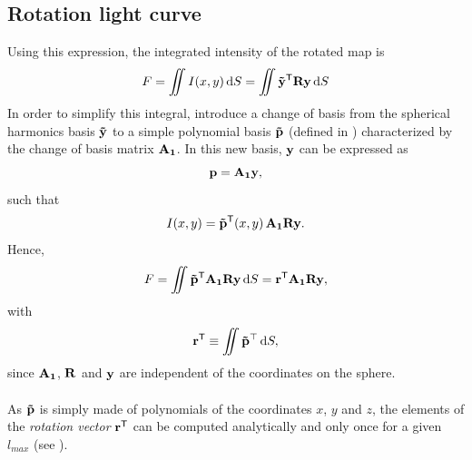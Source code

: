 \documentclass[modern]{aastex631}
\begin{document}
\subsection{Rotation light curve}
Using this expression, the integrated intensity of the rotated map is
\begin{equation}F = \iint I(x,y)\,\text{d}S = \iint \bvec{\tilde y^\mathsf{T}}\bvec{R}\bvec{y}\,\text{d}S\end{equation}
In order to simplify this integral, \citealt{starry} introduce a change of basis from the spherical harmonics basis ${\mathbf{\tilde y}}$ to a simple polynomial basis ${\mathbf{\tilde p}}$ (defined in \citealt[section 2.3]{starry}) characterized by the change of basis matrix ${\mathbf{A_1}}$. In this new basis, ${\mathbf{y}}$ can be expressed as
\begin{equation}\label{eq:p}\bvec{p} = \bvec{A_1}\bvec{y},\end{equation}
such that 
\begin{equation}I(x, y) = \bvec{\tilde p^\mathsf{T}}(x, y)\,\bvec{A_1}\bvec{R}\bvec{y}.\end{equation}
Hence,
\begin{equation}F = \iint \bvec{\tilde p^\mathsf{T}}\bvec{A_1}\bvec{R}\bvec{y}\,\text{d}S = \bvec{r^\mathsf{T}}\bvec{A_1}\bvec{R}\bvec{y},\end{equation}
with
\begin{equation}\bvec{r^\mathsf{T}} \equiv \iint \mathbf{\tilde{p}}^\top\,\text{d}S,\end{equation}
since ${\mathbf{A_1}}$, ${\mathbf{R}}$ and ${\mathbf{y}}$ are independent of the coordinates on the sphere.\\\\
As ${\mathbf{\tilde{p}}}$ is simply made of polynomials of the coordinates $x$, $y$ and $z$, the elements of the \textit{rotation vector} ${\mathbf{r}}^\mathsf{T}$ can be computed analytically and only once for a given $l_{max}$ (see \citealt[Eq. 20]{starry}).\\\\
\end{document}
